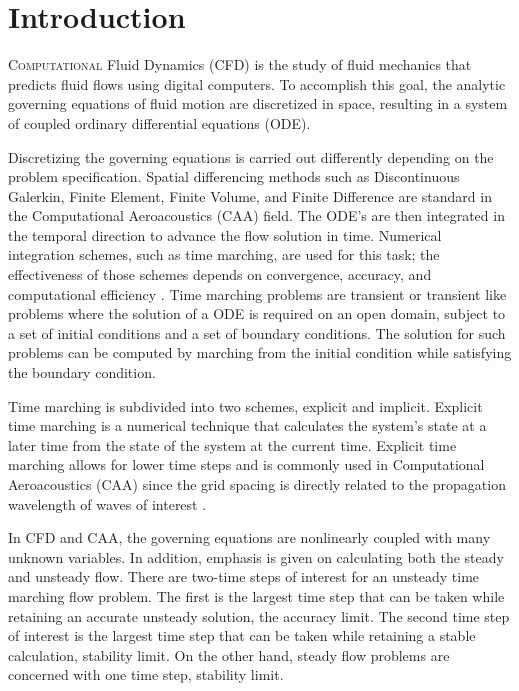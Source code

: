 \documentclass[conf]{new-aiaa}
\begin{document}
\section{Introduction}
\label{sec:Introdtion}
\lettrine{C}{omputational} Fluid Dynamics (CFD) is the study of fluid mechanics that predicts fluid flows using digital computers. 
To accomplish this goal, the analytic governing equations of fluid motion are discretized in space, resulting in a system of coupled ordinary differential equations (ODE). 

Discretizing the governing equations is carried out differently depending on the problem specification. 
Spatial differencing methods such as Discontinuous Galerkin, Finite Element, Finite Volume, and Finite Difference are standard in the Computational Aeroacoustics (CAA) field. 
The ODE's are then integrated in the temporal direction to advance the flow solution in time.
Numerical integration schemes, such as time marching, are used for this task; the effectiveness of those schemes depends on convergence, accuracy, and computational efficiency \cite{Williamson}.
Time marching problems are transient or transient like problems where the solution of a ODE is required on an open domain, subject to a set of initial conditions and a set of boundary conditions. 
The solution for such problems can be computed by marching from the initial condition while satisfying the boundary condition. 

Time marching is subdivided into two schemes, explicit and implicit. 
Explicit time marching is a numerical technique that calculates the system's state at a later time from the state of the system at the current time.
Explicit time marching allows for lower time steps and is commonly used in Computational Aeroacoustics (CAA) since the grid spacing is directly related to the propagation wavelength of waves of interest \cite{YoonLUSGS}. 
    
In CFD and CAA, the governing equations are nonlinearly coupled with many unknown variables. 
In addition, emphasis is given on calculating both the steady and unsteady flow.  
There are two-time steps of interest for an unsteady time marching flow problem. 
The first is the largest time step that can be taken while retaining an accurate unsteady solution, the accuracy limit. 
The second time step of interest is the largest time step that can be taken while retaining a stable calculation, stability limit. 
On the other hand, steady flow problems are concerned with one time step, stability limit.
\end{document}
